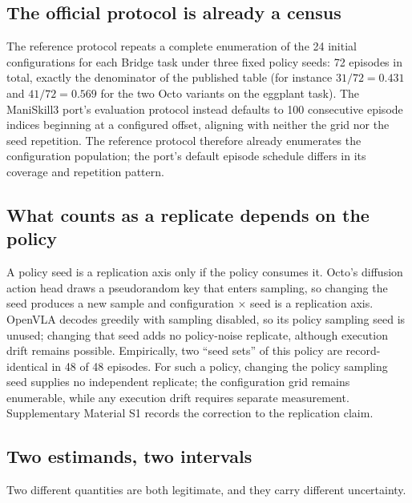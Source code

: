 \documentclass[pdflatex,iicol,sn-apa]{sn-jnl}
\theoremstyle{remark}
\begin{document}
\subsection{The official protocol is already a census}\label{subsec5_2}

The reference protocol repeats a complete enumeration of the 24 initial configurations for each Bridge task under three fixed policy seeds: 72 episodes in total, exactly the denominator of the published table (for instance $31/72 =
0.431$ and $41/72 = 0.569$ for the two Octo variants on the eggplant task). The ManiSkill3 port's
evaluation protocol instead defaults to 100 consecutive episode indices beginning at a configured offset, aligning with
neither the grid nor the seed repetition. The reference protocol therefore already enumerates the configuration population; the port's
default episode schedule differs in its coverage and repetition pattern.

\subsection{What counts as a replicate depends on the policy}\label{subsec5_3}

A policy seed is a replication axis only if the policy consumes it. Octo's diffusion action head
draws a pseudorandom key that enters sampling, so changing the seed produces a new sample and
configuration $\times$ seed is a replication axis. OpenVLA decodes greedily with
sampling disabled, so its policy sampling seed is unused; changing that seed adds no policy-noise
replicate, although execution drift remains possible. Empirically, two ``seed sets'' of this policy are record-identical in 48 of
48 episodes. For such a policy, changing the policy sampling seed supplies no independent replicate; the
configuration grid remains enumerable, while any execution drift requires separate measurement.
Supplementary Material S1 records the correction to the replication claim.

\subsection{Two estimands, two intervals}\label{subsec5_4}

Two different quantities are both legitimate, and they carry different uncertainty.
\end{document}
